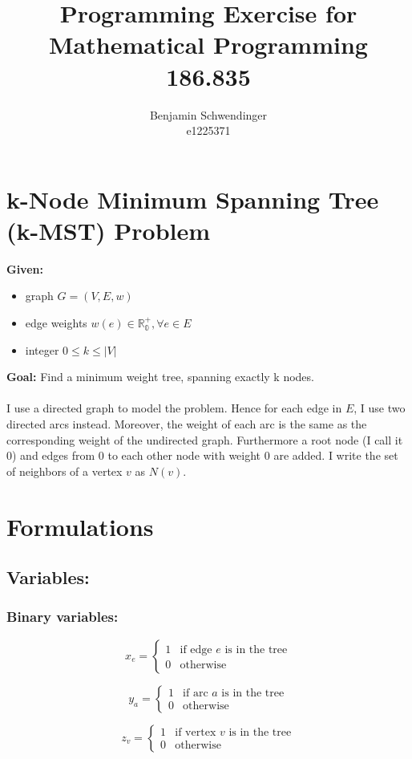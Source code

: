 \documentclass[11pt]{article}
\title{Programming Exercise for Mathematical Programming 186.835}
\author{Benjamin Schwendinger \\
e1225371}
\begin{document}
\maketitle
\section{k-Node Minimum Spanning Tree (k-MST) Problem}
\textbf{Given:}
\begin{itemize}
\item graph $G = (V,E,w)$
\item edge weights $w(e) \in \mathbb{R_0^+}, \forall e \in E$
\item integer $0 \leq k \leq |V|$
\end{itemize}
\textbf{Goal:} Find a minimum weight tree, spanning exactly k nodes.
\\ \\
I use a directed graph to model the problem. Hence for each edge in $E$, I use two directed arcs instead. Moreover, the weight of each arc is the same as the corresponding weight of the undirected graph. Furthermore a root node (I call it 0) and edges from 0 to each other node with weight 0 are added. I write the set of neighbors of a vertex $v$ as $N(v)$.

\section{Formulations}
\subsection{Variables:}
\subsubsection{Binary variables:}
\[
x_e = 
\begin{cases}
1 & \text{if edge $e$ is in the tree} \\
0 & \text{otherwise} 
\end{cases}
\]

\[
y_a = 
\begin{cases}
1 & \text{if arc $a$ is in the tree} \\
0 & \text{otherwise} 
\end{cases}
\]

\[
z_v = 
\begin{cases}
1 & \text{if vertex $v$ is in the tree} \\
0 & \text{otherwise} 
\end{cases}
\]
\end{document}
